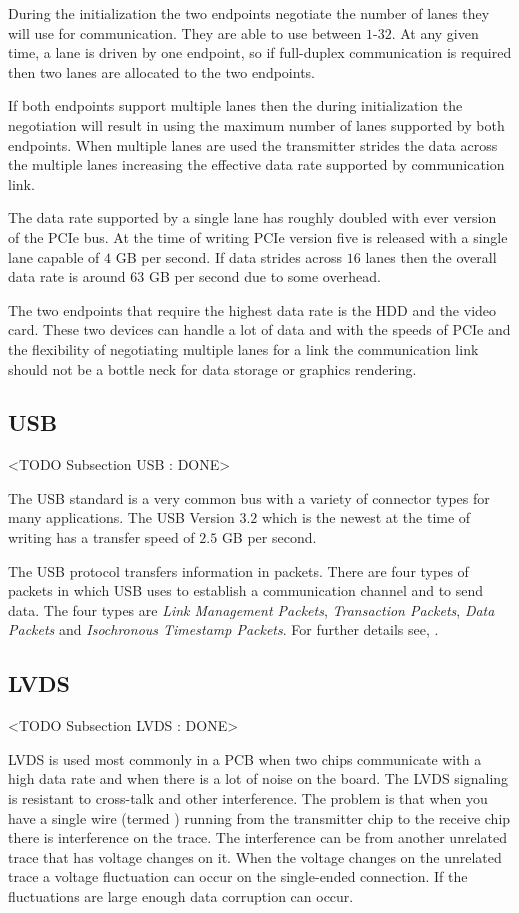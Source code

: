 During the initialization the two endpoints negotiate the number of lanes they will use for communication. They are able to use between $1$-$32$. At any given time, a lane is driven by one endpoint, so if full-duplex communication is required then two lanes are allocated to the two endpoints.

If both endpoints support multiple lanes then the during initialization the negotiation will result in using the maximum number of lanes supported by both endpoints. When multiple lanes are used the transmitter strides the data across the multiple lanes increasing the effective data rate supported by communication link.

The data rate supported by a single lane has roughly doubled with ever version of the \ac{PCIe} bus. At the time of writing \ac{PCIe} version five is released with a single lane capable of $4$ \ac{GB} per second. If data strides across $16$ lanes then the overall data rate is around $63$ \ac{GB} per second due to some overhead.

The two endpoints that require the highest data rate is the \ac{HDD} and the video card. These two devices can handle a lot of data and with the speeds of \ac{PCIe} and the flexibility of negotiating multiple lanes for a link the communication link should not be a bottle neck for data storage or graphics rendering.
	
\subsection{USB}
	<TODO Subsection USB : DONE>

The \ac{USB} standard is a very common bus with a variety of connector types for many applications. The \ac{USB} Version $3.2$ which is the newest at the time of writing has a transfer speed of $2.5$ \ac{GB} per second. \cite{usbref}

The \ac{USB} protocol transfers information in packets. There are four types of packets in which \ac{USB} uses to establish a communication channel and to send data. The four types are \emph{Link Management Packets}, \emph{Transaction Packets}, \emph{Data Packets} and \emph{Isochronous Timestamp Packets}. For further details see, \cite{usbproto}.	
	
\subsection{LVDS}  
	<TODO Subsection LVDS : DONE>	
	
\ac{LVDS} is used most commonly in a \ac{PCB} when two chips communicate with a high data rate and when there is a lot of noise on the board. The \ac{LVDS} signaling is resistant to cross-talk and other interference. The problem is that when you have a single wire (termed ) running from the transmitter chip to the receive chip there is interference on the trace. The interference can be from another unrelated trace that has voltage changes on it. When the voltage changes on the unrelated trace a voltage fluctuation can occur on the single-ended connection. If the fluctuations are large enough data corruption can occur.

